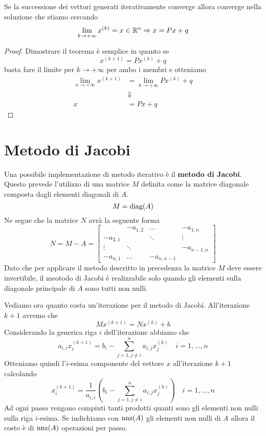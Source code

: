 \begin{theorem}
	Se la successione dei vettori generati iterativamente converge allora converge nella soluzione che stiamo
	cercando
	\[ \lim_{k \to +\infty} x^{(k)} = x \in \mathbb{R}^n \Rightarrow x = Px + q \]
	\begin{proof}
		Dimostrare il teorema è semplice in quanto se
		\[ x^{(k+1)} = P x^{(k)} + q \]
		basta fare il limite per $k \to +\infty$ per ambo i membri e otteniamo
		\begin{align*}
			\lim_{x \to +\infty} x^{(k+1)} & = \lim_{k \to +\infty} P x^{(k)} + q \\
			                               & \Downarrow                           \\
			x                              & = P x + q
		\end{align*}
	\end{proof}
\end{theorem}

\section{Metodo di Jacobi}
Una possibile implementazione di metodo iterativo è il \textbf{metodo di Jacobi}. Questo prevede l'utilizzo
di una matrice $M$ definita come la matrice diagonale composta dagli elementi diagonali di $A$.
\[ M = \operatorname{diag} (A) \]
Ne segue che la matrice $N$ avrà la seguente forma
\[
	N = M - A = \begin{bmatrix}
		         & -a_{1,2} & \dots      & -a_{1,n}   \\
		-a_{2,1} &          & \ddots     & \vdots     \\
		\vdots   & \ddots   &            & -a_{n-1,n} \\
		-a_{n,1} & \dots    & -a_{n,n-1} &
	\end{bmatrix}
\]
Dato che per applicare il metodo descritto in precedenza la matrice $M$ deve essere invertibile, il meotodo di
Jacobi è realizzabile solo quando gli elementi sulla diagonale principale di $A$ sono tutti non nulli.

Vediamo ora quanto costa un'iterazione per il metodo di Jacobi. All'iterazione $k+1$ avremo che
\[ M x^{(k+1)} = N x^{(k)} + b \]
Considerando la generica riga $i$ dell'iterazione abbiamo che
\[ a_{i,i} x^{(k+1)}_i = b_i - \sum_{j=1, j \neq i}^n a_{i,j} x_j^{(k)} \quad i= 1, \dots, n \]
Otteniamo quindi l'$i$-esima componente del vettore $x$ all'iterazione $k+1$ calcolando
\[
	x^{(k+1)}_i =
	\frac{1}{a_{i,i}} \left( b_i - \sum_{j=1, j \neq i}^{n} a_{i,j} x_j^{(k)} \right) \quad i=1,\dots, n
\]
Ad ogni passo vengono compiuti tanti prodotti quanti sono gli elementi non nulli sulla riga $i$-esima. Se
indichiamo con $\operatorname{nnz}(A)$ gli elementi non nulli di $A$ allora il costo è di $\operatorname{nnz}(A)$ operazioni per passo.

